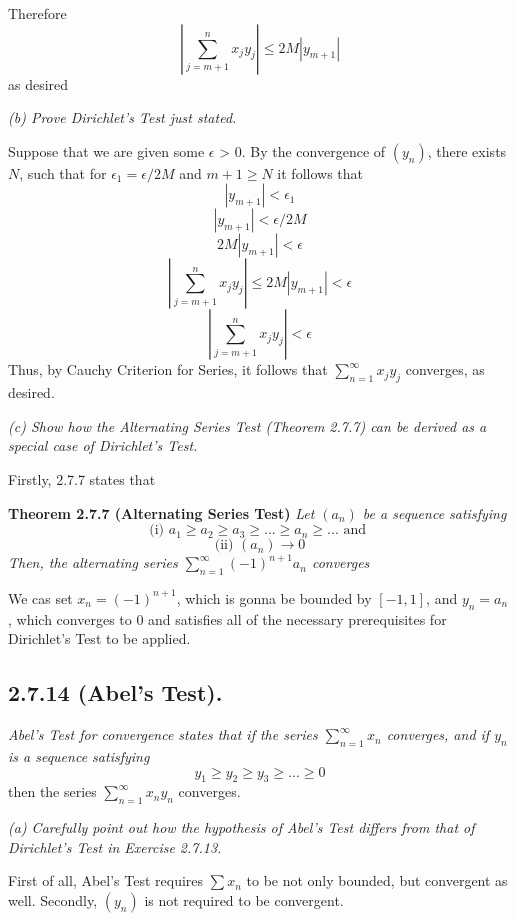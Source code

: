 \documentclass[11pt,oneside,titlepage]{book}
\begin{document}
Therefore
$$\left|\sum_{j = m + 1}^{n} x_j y_j\right| \leq 2M|y_{m + 1}|$$
as desired

\textit{(b) Prove Dirichlet's Test just stated.}

Suppose that we are given some $\epsilon$ > 0. By the convergence of $(y_n)$,
there exists $N$, such that for  $\epsilon_1 = \epsilon / 2M$ and $m + 1 \geq N$ it
follows that
$$|y_{m + 1}| < \epsilon_1$$
$$|y_{m + 1}| < \epsilon / 2M$$
$$2M|y_{m + 1}| < \epsilon$$
$$\left|\sum_{j = m + 1}^{n} x_j y_j\right| \leq 2M|y_{m + 1}| < \epsilon$$
$$\left|\sum_{j = m + 1}^{n} x_j y_j\right|  < \epsilon$$
Thus, by Cauchy Criterion for Series, it follows that
$\sum_{n = 1}^{\infty} x_j y_j$ converges, as desired.

\textit{(c) Show how the Alternating Series Test (Theorem 2.7.7) can be
  derived as a special case of Dirichlet's Test.}

Firstly, 2.7.7 states that

\textbf{Theorem 2.7.7 (Alternating Series Test)}
\textit{Let $(a_n)$ be a sequence satisfying}
$$\text{(i) } a_1 \geq a_2 \geq a_3 \geq ... \geq a_n \geq ... \text{ and }$$
$$\text{(ii) } (a_n) \to 0$$
\textit{Then, the alternating series $\sum_{n = 1}^{\infty}(-1)^{n + 1} a_n$
  converges}

We cas set $x_n = (-1)^{n + 1}$, which is gonna be bounded by $[-1, 1]$, and
$y_n = a_n$, which converges to 0 and satisfies all of the necessary
prerequisites for Dirichlet's Test to be applied.

\subsection*{2.7.14 (Abel's Test).}
\textit{Abel's Test for convergence states that if the series
  $\sum_{n = 1}^{\infty} x_n$ converges, and if $y_n$ is a sequence
  satisfying  }
$$y_1 \geq y_2 \geq y_3 \geq ... \geq 0$$
then the series $\sum_{n = 1}^{\infty} x_n y_n$ converges.

\textit{(a) Carefully point out how the hypothesis of Abel's Test differs from
  that of Dirichlet's Test in Exercise 2.7.13.}

First of all, Abel's Test requires $\sum x_n$ to be not only bounded, but
convergent as well. Secondly, $(y_n)$ is not required to be convergent.
\end{document}

